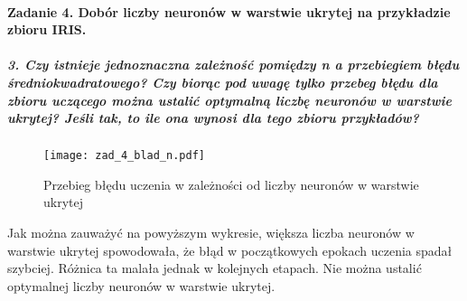 \documentclass{article}
\begin{document}
\paragraph{Zadanie 4. Dobór liczby neuronów w warstwie ukrytej na przykładzie zbioru IRIS.}
\subparagraph{3. Czy istnieje jednoznaczna zależność pomiędzy n a przebiegiem błędu średniokwadratowego? Czy biorąc pod uwagę tylko przebeg błędu dla zbioru uczącego można ustalić optymalną liczbę neuronów w warstwie ukrytej? Jeśli tak, to ile ona wynosi dla tego zbioru przykładów?}

\begin{figure}[H]
\begin{center}
\texttt{[image: zad\_4\_blad\_n.pdf]}
\end{center}
\caption{Przebieg błędu uczenia w zależności od liczby neuronów w warstwie ukrytej}
\label{fig-1Tdelta}
\end{figure}

Jak można zauważyć na powyższym wykresie, większa liczba neuronów w warstwie ukrytej spowodowała, że błąd w początkowych epokach uczenia spadał szybciej. Różnica ta malała jednak w kolejnych etapach. Nie można ustalić optymalnej liczby neuronów w warstwie ukrytej. 
\end{document}
